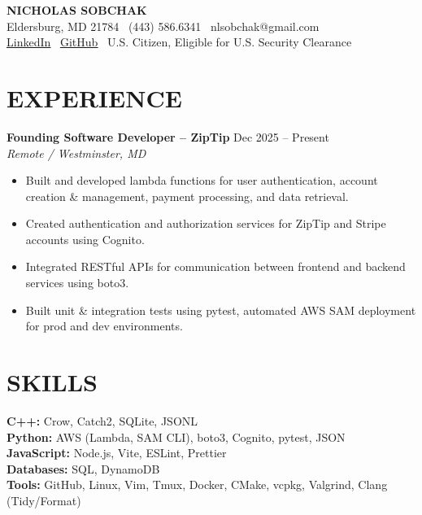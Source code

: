 \documentclass[11pt]{article}
\begin{document}
{\LARGE \textbf{\color{accent} NICHOLAS SOBCHAK}}\\
Eldersburg, MD 21784 \textbar\ (443) 586.6341 \textbar\ nlsobchak@gmail.com\\
\underline{\href{https://linkedin.com/in/nicholas-sobchak-b4aa2a329}{LinkedIn}} \textbar\ 
\underline{\href{https://github.com/NicholasSobchak}{GitHub}} \textbar\ 
U.S. Citizen, Eligible for U.S. Security Clearance

\section*{EXPERIENCE}
\textbf{Founding Software Developer -- ZipTip} \hfill Dec 2025 -- Present\\
\textit{Remote / Westminster, MD}
\begin{itemize}[label=\texttt{\textbf{>}}]
  \item Built and developed lambda functions for user authentication, account creation \& management, payment processing, and data retrieval. 
  \item Created authentication and authorization services for ZipTip and Stripe accounts using Cognito.
  \item Integrated RESTful APIs for communication between frontend and backend services using boto3.
  \item Built unit \& integration tests using pytest, automated AWS SAM deployment for prod and dev environments.
\end{itemize}

\section*{SKILLS}
\textbf{C++:} Crow, Catch2, SQLite, JSONL \\
\textbf{Python:} AWS (Lambda, SAM CLI), boto3, Cognito, pytest, JSON \\
\textbf{JavaScript:} Node.js, Vite, ESLint, Prettier \\
\textbf{Databases:} SQL, DynamoDB \\
\textbf{Tools:} GitHub, Linux, Vim, Tmux, Docker, CMake, vcpkg, Valgrind, Clang (Tidy/Format)

\end{document}
